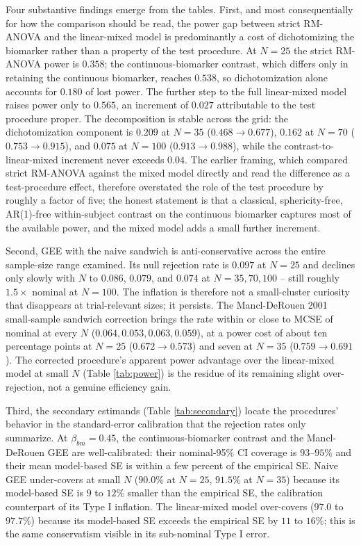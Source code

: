 \documentclass[
  11pt,
]{article}
\begin{document}
Four substantive findings emerge from the tables. First, and most
consequentially for how the comparison should be read, the
power gap between strict RM-ANOVA and the linear-mixed model is
predominantly a cost of dichotomizing the biomarker rather than a
property of the test procedure. At \(N = 25\) the strict RM-ANOVA
power is \(0.358\); the continuous-biomarker contrast, which differs
only in retaining the continuous biomarker, reaches \(0.538\), so
dichotomization alone accounts for \(0.180\) of lost power. The
further step to the full linear-mixed model raises power only to
\(0.565\), an increment of \(0.027\) attributable to the test
procedure proper. The decomposition is stable across the grid:
the dichotomization component is \(0.209\) at \(N = 35\)
(\(0.468 \to 0.677\)), \(0.162\) at \(N = 70\) (\(0.753 \to 0.915\)),
and \(0.075\) at \(N = 100\) (\(0.913 \to 0.988\)), while the
contrast-to-linear-mixed increment never exceeds \(0.04\). The
earlier framing, which compared strict RM-ANOVA against the mixed
model directly and read the difference as a test-procedure
effect, therefore overstated the role of the test procedure by
roughly a factor of five; the honest statement is that a
classical, sphericity-free, AR(1)-free within-subject contrast on
the continuous biomarker captures most of the available power,
and the mixed model adds a small further increment.

Second, GEE with the naive sandwich is anti-conservative across
the entire sample-size range examined. Its null rejection rate is
\(0.097\) at \(N = 25\) and declines only slowly with \(N\) to
\(0.086\), \(0.079\), and \(0.074\) at \(N = 35, 70, 100\) -- still
roughly \(1.5\times\) nominal at \(N = 100\). The inflation is
therefore not a small-cluster curiosity that disappears at
trial-relevant sizes; it persists. The Mancl-DeRouen 2001
small-sample sandwich correction brings the rate within or close
to MCSE of nominal at every \(N\) (\(0.064, 0.053, 0.063, 0.059\)),
at a power cost of about ten percentage points at \(N = 25\)
(\(0.672 \to 0.573\)) and seven at \(N = 35\) (\(0.759 \to 0.691\)).
The corrected procedure's apparent power advantage over the
linear-mixed model at small \(N\) (Table \ref{tab:power}) is the
residue of its remaining slight over-rejection, not a genuine
efficiency gain.

Third, the secondary estimands (Table \ref{tab:secondary})
locate the procedures' behavior in the standard-error
calibration that the rejection rates only summarize. At
\(\beta_{bm} = 0.45\), the continuous-biomarker contrast and the
Mancl-DeRouen GEE are well-calibrated: their nominal-95\% CI
coverage is \(93\)--\(95\%\) and their mean model-based SE is within
a few percent of the empirical SE. Naive GEE under-covers at
small \(N\) (\(90.0\%\) at \(N = 25\), \(91.5\%\) at \(N = 35\)) because
its model-based SE is \(9\) to \(12\%\) smaller than the empirical
SE, the calibration counterpart of its Type I inflation. The
linear-mixed model over-covers (\(97.0\) to \(97.7\%\)) because its
model-based SE exceeds the empirical SE by \(11\) to \(16\%\); this
is the same conservatism visible in its sub-nominal Type I error.
\end{document}
